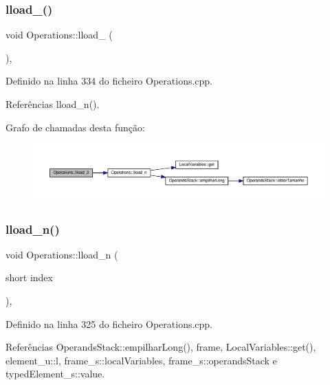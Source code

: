 \subsubsection{\texorpdfstring{lload\+\_()}{lload\_3()}}
{\footnotesize\ttfamily void Operations\+::lload\+\_ (\begin{DoxyParamCaption}{ }\end{DoxyParamCaption})\hspace{0.3cm}{\ttfamily [static]}, {\ttfamily [private]}}



Definido na linha 334 do ficheiro Operations.\+cpp.



Referências lload\+\_\+n().

Grafo de chamadas desta função\+:
\nopagebreak
\begin{figure}[H]
\begin{center}
\leavevmode
\includegraphics[width=350pt]{classOperations_af2f8b1e41b734f43e73d9d6811eb427b_cgraph}
\end{center}
\end{figure}
\mbox{\label{classOperations_a4f70442aed776d9ccae4dfd379715cd4}} 
\subsubsection{\texorpdfstring{lload\+\_\+n()}{lload\_n()}}
{\footnotesize\ttfamily void Operations\+::lload\+\_\+n (\begin{DoxyParamCaption}\item[{short}]{index }\end{DoxyParamCaption})\hspace{0.3cm}{\ttfamily [static]}, {\ttfamily [private]}}



Definido na linha 325 do ficheiro Operations.\+cpp.



Referências Operands\+Stack\+::empilhar\+Long(), frame, Local\+Variables\+::get(), element\+\_\+u\+::l, frame\+\_\+s\+::local\+Variables, frame\+\_\+s\+::operands\+Stack e typed\+Element\+\_\+s\+::value.



